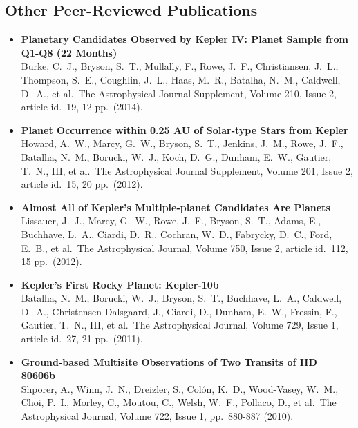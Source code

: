 \documentclass[11pt,letterpaper,sans]{moderncv} %
\begin{document}
\subsection{Other Peer-Reviewed Publications}
\begin{itemize}
\item \textbf{ Planetary Candidates Observed by Kepler IV: Planet Sample 
from Q1-Q8 (22 Months) } \\ Burke, C.~J., Bryson, S.~T., Mullally, F., 
Rowe, J.~F., Christiansen, J.~L., Thompson, S.~E., Coughlin, J.~L., Haas, 
M.~R., Batalha, N.~M., Caldwell, D.~A., et al.\ The Astrophysical Journal 
Supplement, Volume 210, Issue 2, article id.~19, 12 pp.~(2014).\ \\ 

 \item \textbf{ Planet Occurrence within 0.25 AU of Solar-type Stars from 
Kepler } \\ Howard, A.~W., Marcy, G.~W., Bryson, S.~T., Jenkins, J.~M., 
Rowe, J.~F., Batalha, N.~M., Borucki, W.~J., Koch, D.~G., Dunham, E.~W., 
Gautier, T.~N., III, et al.\ The Astrophysical Journal Supplement, Volume 
201, Issue 2, article id.~15, 20 pp.~(2012).\ \\ 


 \item \textbf{ Almost All of Kepler's Multiple-planet Candidates Are 
Planets } \\ Lissauer, J.~J., Marcy, G.~W., Rowe, J.~F., Bryson, S.~T., 
Adams, E., Buchhave, L.~A., Ciardi, D.~R., Cochran, W.~D., Fabrycky, D.~C., 
Ford, E.~B., et al.\ The Astrophysical Journal, Volume 750, Issue 2, 
article id.~112, 15 pp.~(2012).\ \\ 

 \item \textbf{ Kepler's First Rocky Planet: Kepler-10b } \\ Batalha, 
N.~M., Borucki, W.~J., Bryson, S.~T., Buchhave, L.~A., Caldwell, D.~A., 
Christensen-Dalsgaard, J., Ciardi, D., Dunham, E.~W., Fressin, F., Gautier, 
T.~N., III, et al.\ The Astrophysical Journal, Volume 729, Issue 1, article 
id.~27, 21 pp.~(2011).\ \\ 

 \item \textbf{ Ground-based Multisite Observations of Two Transits of HD 
80606b } \\ Shporer, A., Winn, J.~N., Dreizler, S., Col{\'o}n, K.~D., 
Wood-Vasey, W.~M., Choi, P.~I., Morley, C., Moutou, C., Welsh, W.~F., 
Pollaco, D., et al.\ The Astrophysical Journal, Volume 722, Issue 1, 
pp.~880-887 (2010).\ \\ 


\end{itemize}
\end{document}
